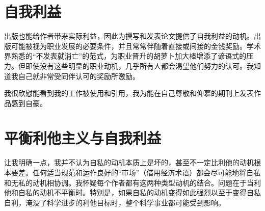 \section*{自我利益}
出版也能给作者带来实际利益，因此为撰写和发表论文提供了自我利益的动机。出版可能被视为职业发展的必要条件，并且常常伴随着直接或间接的金钱奖励。学术界熟悉的“不发表就消亡”的范式，为职业晋升的胡萝卜加大棒增添了谚语式的压力。但即使没有这些明显的职业动机，几乎所有人都会渴望他们努力的认可。我知道我自己就非常受同伴认可的奖励所激励。

我很欣慰能看到我的工作被使用和引用，我为能在自己尊敬和仰慕的期刊上发表作品感到自豪。

\section*{平衡利他主义与自我利益}
让我明确一点，我并不认为自私的动机本质上是坏的，甚至不一定比利他的动机根本要差。任何适当规范和运作良好的“市场”（借用经济术语）都会尽可能地将自私和无私的动机相协调。我怀疑每个作者都有这两种类型动机的结合。问题在于当利他和自私的动机不平衡时。特别是，如果自私的动机变得如此强烈以至于变得自私自利，淹没了科学进步的利他目标时，整个科学事业都可能受到影响。

